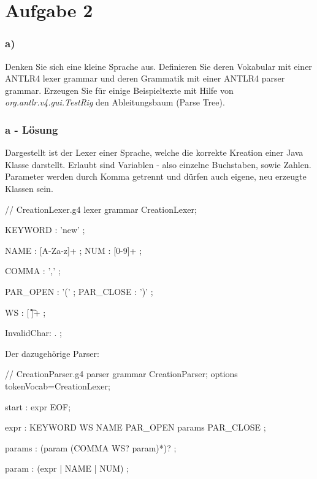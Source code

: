 \chapter{Aufgabe 2}
\label{sec:aufgabe2}

\subsection*{a)}
Denken Sie sich eine kleine Sprache aus.
Definieren Sie deren Vokabular mit einer ANTLR4 lexer grammar und deren Grammatik mit einer ANTLR4 parser grammar.
Erzeugen Sie für einige Beispieltexte mit Hilfe von \textit{org.antlr.v4.gui.TestRig} den Ableitungsbaum (Parse Tree).

\subsection*{a - Lösung}
Dargestellt ist der Lexer einer Sprache, welche die korrekte Kreation einer Java Klasse darstellt.
Erlaubt sind Variablen - also einzelne Buchstaben, sowie Zahlen.
Parameter werden durch Komma getrennt und dürfen auch eigene, neu erzeugte Klassen sein.
\newline
\begin{code}[language=antlr, caption={Lexer Grammar A2a} ,label={lst:Aufgabe2a_lexer}]
    // CreationLexer.g4
    lexer grammar CreationLexer;

    KEYWORD : 'new' ;

    NAME : [A-Za-z]+ ;
    NUM : [0-9]+ ;

    COMMA : ',' ;

    PAR_OPEN : '(' ;
    PAR_CLOSE : ')' ;

    WS : [ \t\r\n]+ ;

    InvalidChar: . ;
\end{code}

\newpage

Der dazugehörige Parser:
\begin{code}[language=antlr, caption={Parser Grammar A2a}, label={lst:Aufgabe2a_parser}]
    // CreationParser.g4
    parser grammar CreationParser;
    options { tokenVocab=CreationLexer; }

    start : expr EOF;

    expr : KEYWORD WS NAME PAR_OPEN params PAR_CLOSE ;

    params : (param (COMMA WS? param)*)? ;

    param : (expr | NAME | NUM) ;
\end{code}
\newline

